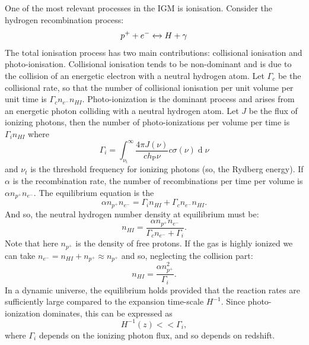 One of the most relevant processes in the IGM is ionisation. Consider the hydrogen recombination process:
$$p^+ + e^- \xleftrightarrow \ H +\gamma$$
The total ionisation process has two main contributions: collisional ionisation and photo-ionisation.
Collisional ionisation tends to be non-dominant and is due to the collision of an energetic electron with a neutral hydrogen atom. Let $\Gamma_c$ be the collisional rate, so that the number of collisional ionisation per unit volume per unit time is $\Gamma_c n_{e^-}n_{HI}$. Photo-ionization is the dominant process and arises from an energetic photon colliding with a neutral hydrogen atom. Let $J$ be the flux of ionizing photons, then the number of photo-ionizations per volume per time is $\Gamma_i n_{HI}$ where 
\begin{equation}
    \Gamma_i=\int_{\nu_\mathrm{t}}^\infty\frac{4\pi J(\nu)}{ch_\mathrm{P}\nu}c\sigma(\nu)\operatorname{d}\nu
\end{equation}
and $\nu_t$ is the threshold frequency for ionizing photons (so, the Rydberg energy). If $\alpha$ is the recombination rate, the number of recombinations per time per volume is $\alpha n_{p^+}n_{e^-}$.
The equilibrium equation is the
\begin{equation}
    \alpha n_{p^+}n_{e^-}=\Gamma_i n_{HI}+\Gamma_cn_{e^-}n_{HI}.  
\end{equation}
And so, the neutral hydrogen number density at equilibrium must be:
\begin{equation}
    n_{HI}=\frac{\alpha n_{p^+}n_{e^-}}{\Gamma_c n_{e^-}+\Gamma_i}.
\end{equation}
Note that here $n_{p^+}$ is the density of free protons. If the gas is highly ionized we can take $n_{e^-}=n_{HI}+n_{p^+}\approx n_{p^+}$ and so, neglecting the collision part:
\begin{equation}
    n_{HI}=\frac{\alpha n_{p^+}^2}{\Gamma_i}.
\end{equation}
In a dynamic universe, the equilibrium holds provided that the reaction rates are sufficiently large compared to the expansion time-scale $H^{-1}$. Since photo-ionization dominates, this can be expressed as 
\begin{equation}
    H^{-1}(z)<< \Gamma_i,
\end{equation}
where $\Gamma_i$ depends on the ionizing photon flux, and so depends on redshift.
















